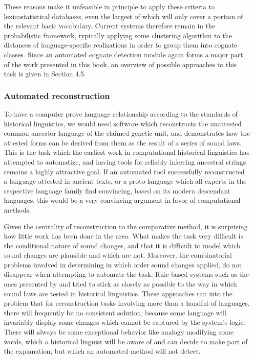 These reasons make it unfeasible in principle to apply these criteria to lexicostatistical databases, even the largest of which will only cover a portion of the relevant basic vocabulary. Current systems therefore remain in the probabilistic framework, typically applying some clustering algorithm to the distances of language-specific realizations in order to group them into cognate classes. Since an automated cognate detection module again forms a major part of the work presented in this book, an overview of possible approaches to this task is given in Section 4.5.

\subsubsection{Automated reconstruction}
To have a computer prove language relationship according to the standards of historical linguistics, we would need software which reconstructs the unattested common ancestor language of the claimed genetic unit, and demonstrates how the attested forms can be derived from them as the result of a series of sound laws. This is the task which the earliest work in computational historical linguistics has attempted to automatize, and having tools for reliably inferring ancestral strings remains a highly attractive goal. If an automated tool successfully reconstructed a language attested in ancient texts, or a proto-language which all experts in the respective language family find convincing, based on its modern descendant languages, this would be a very convincing argument in favor of computational methods.

Given the centrality of reconstruction to the comparative method, it is surprising how little work has been done in the area. What makes the task very difficult is the conditional nature of sound changes, and that it is difficult to model which sound changes are plausible and which are not. Moreover, the combinatorial problems involved in determining in which order sound changes applied, do not disappear when attempting to automate the task. Rule-based systems such as the ones presented by \citet{hewson1974} and \citet{oakes2000} tried to stick as closely as possible to the way in which sound laws are tested in historical linguistics. These approaches ran into the problem that for reconstruction tasks involving more than a handful of languages, there will frequently be no consistent solution, because some language will invariably display some changes which cannot be captured by the system's logic. There will always be some exceptional behavior like analogy modifying some words, which a historical linguist 
will be aware of and can decide to make part of the explanation, but which an automated method will not detect.

